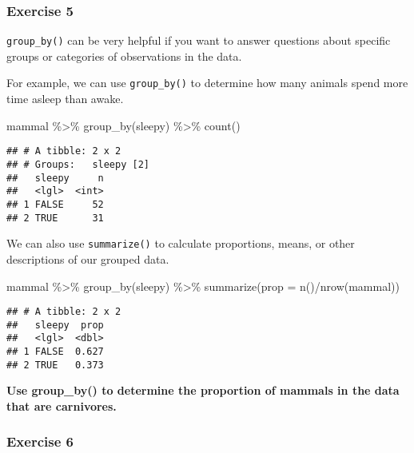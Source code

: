 \documentclass[]{article}
\newenvironment{Shaded}{\begin{snugshade}}{\end{snugshade}}
\newcommand{\AttributeTok}[1]{\textcolor[rgb]{0.77,0.63,0.00}{#1}}
\newcommand{\FunctionTok}[1]{\textcolor[rgb]{0.00,0.00,0.00}{#1}}
\newcommand{\NormalTok}[1]{#1}
\newcommand{\SpecialCharTok}[1]{\textcolor[rgb]{0.00,0.00,0.00}{#1}}
\begin{document}
\hypertarget{exercise-5}{%
\subsubsection{Exercise 5}\label{exercise-5}}

\texttt{group\_by()} can be very helpful if you want to answer questions
about specific groups or categories of observations in the data.

For example, we can use \texttt{group\_by()} to determine how many
animals spend more time asleep than awake.

\begin{Shaded}
\begin{Highlighting}[]
\NormalTok{mammal }\SpecialCharTok{\%\textgreater{}\%}
  \FunctionTok{group\_by}\NormalTok{(sleepy) }\SpecialCharTok{\%\textgreater{}\%}
  \FunctionTok{count}\NormalTok{()}
\end{Highlighting}
\end{Shaded}

\begin{verbatim}
## # A tibble: 2 x 2
## # Groups:   sleepy [2]
##   sleepy     n
##   <lgl>  <int>
## 1 FALSE     52
## 2 TRUE      31
\end{verbatim}

We can also use \texttt{summarize()} to calculate proportions, means, or
other descriptions of our grouped data.

\begin{Shaded}
\begin{Highlighting}[]
\NormalTok{mammal }\SpecialCharTok{\%\textgreater{}\%}
  \FunctionTok{group\_by}\NormalTok{(sleepy) }\SpecialCharTok{\%\textgreater{}\%}
  \FunctionTok{summarize}\NormalTok{(}\AttributeTok{prop =} \FunctionTok{n}\NormalTok{()}\SpecialCharTok{/}\FunctionTok{nrow}\NormalTok{(mammal))}
\end{Highlighting}
\end{Shaded}

\begin{verbatim}
## # A tibble: 2 x 2
##   sleepy  prop
##   <lgl>  <dbl>
## 1 FALSE  0.627
## 2 TRUE   0.373
\end{verbatim}

\textbf{Use group\_by() to determine the proportion of mammals in the
data that are carnivores.}

\hypertarget{exercise-6}{%
\subsubsection{Exercise 6}\label{exercise-6}}
\end{document}
